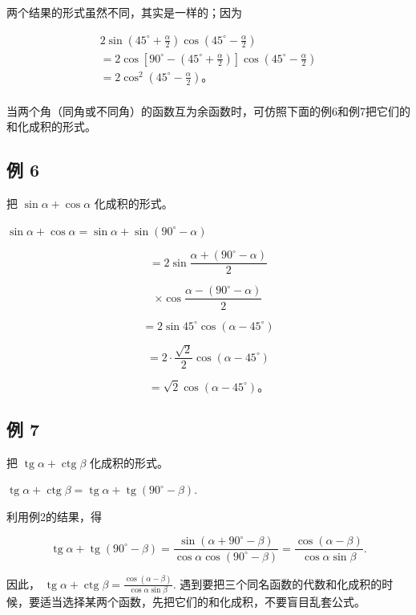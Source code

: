 两个结果的形式虽然不同，其实是一样的；因为

\[
\begin{array}{l} 2 \sin \left(45 ^{\circ} + \frac {\alpha}{2}\right) \cos \left(45 ^{\circ} - \frac {\alpha}{2}\right) \\ = 2 \cos \left[ 90 ^{\circ} - \left(45 ^{\circ} + \frac {\alpha}{2}\right) \right] \cos \left(45 ^{\circ} - \frac {\alpha}{2}\right) \\ = 2 \cos^ {2} \left(45 ^{\circ} - \frac {\alpha}{2}\right)\text{。} \\ \end{array}
\]

当两个角（同角或不同角）的函数互为余函数时，可仿照下面的例6和例7把它们的和化成积的形式。

\subsection{例 6}

把 \(\sin \alpha + \cos \alpha\) 化成积的形式。

\(\sin \alpha + \cos \alpha = \sin \alpha + \sin (90^{\circ} - \alpha)\)

\[
= 2 \sin \frac {\alpha + (90 ^{\circ} - \alpha)}{2}
\]

\[
\times \cos \frac {\alpha - (90 ^{\circ} - \alpha)}{2}
\]

\[
= 2 \sin 45 ^{\circ} \cos (\alpha - 45 ^{\circ})
\]

\[
= 2 \cdot \frac {\sqrt {2}}{2} \cos (\alpha - 45 ^{\circ})
\]

\[
= \sqrt {2} \cos (\alpha - 45 ^{\circ})\text{。}
\]

\subsection{例 7}

把 \(\operatorname{tg} \alpha + \operatorname{ctg} \beta\)
化成积的形式。

\(\operatorname{tg} \alpha + \operatorname{ctg} \beta = \operatorname{tg} \alpha + \operatorname{tg}(90^\circ - \beta)\).

利用例2的结果，得

\[
\operatorname{tg} \alpha + \operatorname{tg} (90 ^{\circ} - \beta) = \frac {\sin (\alpha + 90 ^{\circ} - \beta)}{\cos \alpha \cos (90 ^{\circ} - \beta)} = \frac {\cos (\alpha - \beta)}{\cos \alpha \sin \beta}.
\]

因此，
\(\operatorname{tg}\alpha +\operatorname{ctg}\beta = \frac{\cos(\alpha - \beta)}{\cos\alpha\sin\beta}.\)
遇到要把三个同名函数的代数和化成积的时候，要适当选择某两个函数，先把它们的和化成积，不要盲目乱套公式。

